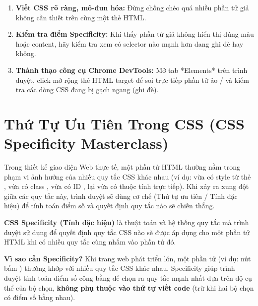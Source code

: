 \begin{tipBox}
\begin{enumerate}[leftmargin=1.5em, itemsep=3pt, parsep=0pt]
    \item \textbf{Viết CSS rõ ràng, mô-đun hóa:} Đừng chồng chéo quá nhiều phần tử giả không cần thiết trên cùng một thẻ HTML.
    \item \textbf{Kiểm tra điểm Specificity:} Khi thấy phần tử giả không hiển thị đúng màu hoặc content, hãy kiểm tra xem có selector nào mạnh hơn đang ghi đè hay không.
    \item \textbf{Thành thạo công cụ Chrome DevTools:} Mở tab *Elements* trên trình duyệt, click mở rộng thẻ HTML target để soi trực tiếp phần tử ảo  /  và kiểm tra các dòng CSS đang bị gạch ngang (ghi đè).
\end{enumerate}
\end{tipBox}




\section{Thứ Tự Ưu Tiên Trong CSS (CSS Specificity Masterclass)}


Trong thiết kế giao diện Web thực tế, một phần tử HTML thường nằm trong phạm vi ảnh hưởng của nhiều quy tắc CSS khác nhau (ví dụ: vừa có style từ thẻ , vừa có class , vừa có ID , lại vừa có thuộc tính  trực tiếp). Khi xảy ra xung đột giữa các quy tắc này, trình duyệt sẽ dùng cơ chế  (Thứ tự ưu tiên / Tính đặc hiệu) để tính toán điểm số và quyết định quy tắc nào sẽ chiến thắng.

\begin{conceptBox}
\textbf{CSS Specificity (Tính đặc hiệu)} là thuật toán và hệ thống quy tắc mà trình duyệt sử dụng để quyết định quy tắc CSS nào sẽ được áp dụng cho một phần tử HTML khi có nhiều quy tắc cùng nhắm vào phần tử đó.
\par\vspace{4pt}
\textbf{Vì sao cần Specificity?} Khi trang web phát triển lớn, một phần tử (ví dụ: nút bấm ) thường khớp với nhiều quy tắc CSS khác nhau. Specificity giúp trình duyệt tính toán điểm số công bằng để chọn ra quy tắc mạnh nhất dựa trên độ cụ thể của bộ chọn, \textbf{không phụ thuộc vào thứ tự viết code} (trừ khi hai bộ chọn có điểm số bằng nhau).
\end{conceptBox}

